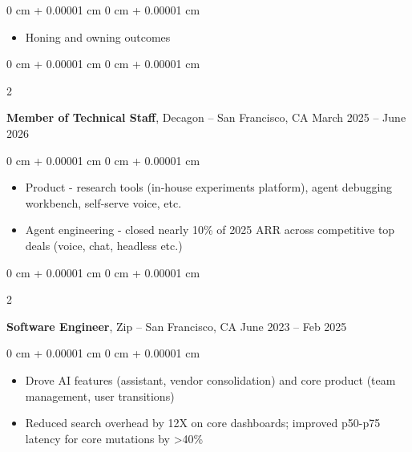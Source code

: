 \documentclass[10pt, letterpaper]{article}
\newenvironment{highlights}{
    \begin{itemize}[
        topsep=0.10 cm,
        parsep=0.10 cm,
        partopsep=0pt,
        itemsep=0pt,
        leftmargin=0 cm + 10pt
    ]
}{
    \end{itemize}
} %
\newenvironment{onecolentry}{
    \begin{adjustwidth}{
        0 cm + 0.00001 cm
    }{
        0 cm + 0.00001 cm
    }
}{
    \end{adjustwidth}
} %
\newenvironment{twocolentry}[2][]{
    \onecolentry
    \def\secondColumn{#2}
    \setcolumnwidth{\fill, 4.5 cm}
    \begin{paracol}{2}
}{
    \switchcolumn \raggedleft \secondColumn
    \end{paracol}
    \endonecolentry
} %
\begin{document}
        \vspace{0.10 cm}
        \begin{onecolentry}
            \begin{highlights}
                \item Honing and owning outcomes
            \end{highlights}
        \end{onecolentry}


        \vspace{0.2 cm}


        \begin{twocolentry}{
            March 2025 – June 2026
        }
            \textbf{Member of Technical Staff}, Decagon -- San Francisco, CA\end{twocolentry}

        \vspace{0.10 cm}
        \begin{onecolentry}
            \begin{highlights}
                \item Product - research tools (in-house experiments platform), agent debugging workbench, self-serve voice, etc.
                \item Agent engineering - closed nearly 10\% of 2025 ARR across competitive top deals (voice, chat, headless etc.)
            \end{highlights}
        \end{onecolentry}


        \vspace{0.2 cm}

        
        \begin{twocolentry}{
            June 2023 – Feb 2025
        }
            \textbf{Software Engineer}, Zip -- San Francisco, CA\end{twocolentry}

        \vspace{0.10 cm}
        \begin{onecolentry}
            \begin{highlights}
                \item Drove AI features (assistant, vendor consolidation) and core product (team management, user transitions)
                \item Reduced search overhead by 12X on core dashboards; improved p50-p75 latency for core mutations by >40\%
            \end{highlights}
        \end{onecolentry}
\end{document}
